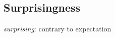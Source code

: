 \documentclass[aspectratio=169]{beamer}
\begin{document}
\subsection{Surprisingness}

\begin{frame}

  






  
  \begin{center}\emph{surprising}: \alert{contrary to expectation}\end{center}


\end{frame}
\end{document}
